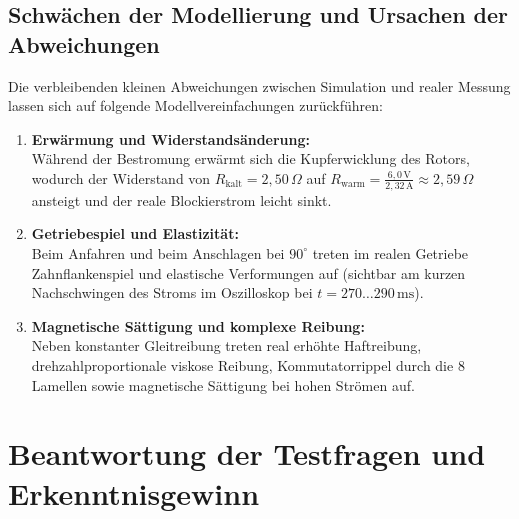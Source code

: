 \documentclass[a4paper,10pt,department=FakEI]{OTHRartcl}
\begin{document}
\subsection{Schwächen der Modellierung und Ursachen der Abweichungen}
Die verbleibenden kleinen Abweichungen zwischen Simulation und realer Messung lassen sich auf folgende Modellvereinfachungen zurückführen:
\begin{enumerate}\setlength{\itemsep}{2pt}
    \item \textbf{Erwärmung und Widerstandsänderung:}\\
    Während der Bestromung erwärmt sich die Kupferwicklung des Rotors, wodurch der Widerstand von $R_{\text{kalt}} = 2{,}50\,\Omega$ auf $R_{\text{warm}} = \frac{6{,}0\,\text{V}}{2{,}32\,\text{A}} \approx 2{,}59\,\Omega$ ansteigt und der reale Blockierstrom leicht sinkt.
    \item \textbf{Getriebespiel und Elastizität:}\\
    Beim Anfahren und beim Anschlagen bei $90^\circ$ treten im realen Getriebe Zahnflankenspiel und elastische Verformungen auf (sichtbar am kurzen Nachschwingen des Stroms im Oszilloskop bei $t = 270\dots 290\,\text{ms}$).
    \item \textbf{Magnetische Sättigung und komplexe Reibung:}\\
    Neben konstanter Gleitreibung treten real erhöhte Haftreibung, drehzahlproportionale viskose Reibung, Kommutatorrippel durch die 8 Lamellen sowie magnetische Sättigung bei hohen Strömen auf.
\end{enumerate}



\section{Beantwortung der Testfragen und Erkenntnisgewinn}
\end{document}
